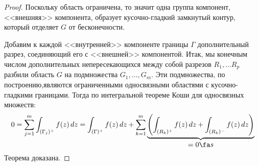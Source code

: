 \begin{proof}
Поскольку область ограничена, то значит одна группа компонент, <<внешняя>> компонента, образует кусочно-гладкий замкнутый контур, который отделяет $G$ от бесконечности.

Добавим к каждой <<внутренней>> компоненте границы $\Gamma$ дополнительный разрез, соединяющий его с <<внешней>> компонентой. 
Итак, мы конечным числом дополнительных непересекающихся между собой разрезов $R_1,\dots R_p$ разбили область $G$ на  подмножества $G_1,\dots, G_m$. Эти подмножества, по построению,являются ограниченными односвязными областями с кусочно-гладкими границами. Тогда по интегральной теореме Коши для односвязных множеств:
$$
0=\sum_{j=1}^m \int_{(\Gamma_j)^+} f(z) \,dz = \int_{(\Gamma)^+} f(z)\,dz + \sum_{k=1}^{m} \underbrace{\left( \int_{(R_k)^+}f(z)\,dz + \int_{(R_k)^-}f(z)\,dz \right)}_{\textstyle =0 \fa s}
$$ 
\noindent 
Теорема доказана.
\end{proof}